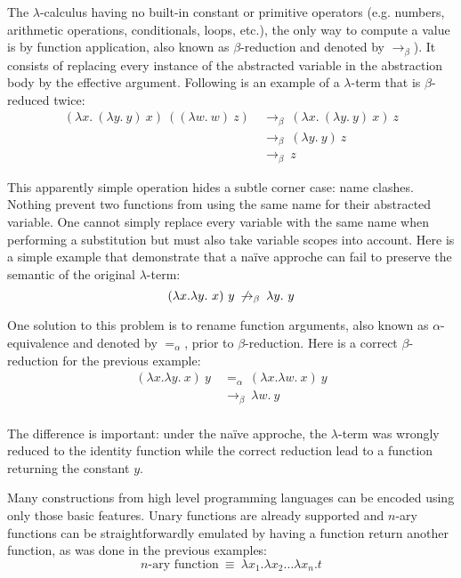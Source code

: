The $\lambda$-calculus having no built-in constant or primitive operators (e.g. numbers, arithmetic
operations, conditionals, loops, etc.), the only way to compute a value is by function application,
also known as $\beta$-reduction and denoted by $\to_\beta$). It consists of replacing every instance
of the abstracted variable in the abstraction body by the effective argument.  Following is an
example of a $\lambda$-term that is $\beta$-reduced twice:
\begin{align*}
  (\lambda x. \ (\lambda y. \ y) \ x) \ ((\lambda w. \ w) \ z)
    & \: \to_\beta \: (\lambda x. \ (\lambda y. \ y) \ x) \ z \\
    & \: \to_\beta \: (\lambda y. \ y) \ z \\
    & \: \to_\beta \: z
\end{align*}

This apparently simple operation hides a subtle corner case: name clashes. Nothing prevent two
functions from using the same name for their abstracted variable. One cannot simply replace every
variable with the same name when performing a substitution but must also take variable scopes into
account. Here is a simple example that demonstrate that a naïve approche can fail to preserve the
semantic of the original $\lambda$-term:
\begin{displaymath}
  (\lambda x. \lambda y. \ x) \ y \: \not\to_\beta \: \lambda y. \ y \\
\end{displaymath}

One solution to this problem is to rename function arguments, also known as $\alpha$-equivalence and
denoted by $=_\alpha$, prior to $\beta$-reduction. Here is a correct $\beta$-reduction for the previous
example:
\begin{align*}
  (\lambda x. \lambda y. \ x) \ y
    & \: =_\alpha \: (\lambda x. \lambda w. \ x) \ y \\
    & \: \to_\beta \: \lambda w. \ y \\
\end{align*}

The difference is important: under the naïve approche, the $\lambda$-term was wrongly reduced to the
identity function while the correct reduction lead to a function returning the constant $y$.

Many constructions from high level programming languages can be encoded using only those basic
features. Unary functions are already supported and $n$-ary functions can be straightforwardly
emulated by having a function return another function, as was done in the previous examples:
\begin{displaymath}
  n\text{-ary function} \: \equiv \: \lambda x_1. \lambda x_2 \dots \lambda x_n. t
\end{displaymath}

